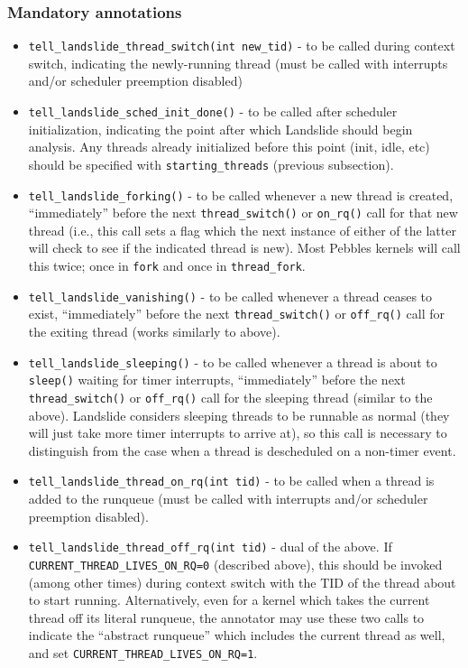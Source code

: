 \subsubsection{Mandatory annotations}

\begin{itemize}
	\item {\tt tell\_landslide\_thread\_switch(int new\_tid)} - to be called during context switch, indicating the newly-running thread
		(must be called with interrupts and/or scheduler preemption disabled)
	\item {\tt tell\_landslide\_sched\_init\_done()} - to be called after scheduler initialization,
		indicating the point after which Landslide should begin analysis.
		Any threads already initialized before this point (init, idle, etc) should be specified with {\tt starting\_threads} (previous subsection).
	\item {\tt tell\_landslide\_forking()} - to be called whenever a new thread is created,
		``immediately'' before the next {\tt thread\_switch()} or {\tt on\_rq()} call for that new thread (i.e., this call sets a flag which the next instance of either of the latter will check to see if the indicated thread is new).
		Most Pebbles kernels will call this twice; once in {\tt fork} and once in {\tt thread\_fork}.
	\item {\tt tell\_landslide\_vanishing()} - to be called whenever a thread ceases to exist,
		``immediately'' before the next {\tt thread\_switch()} or {\tt off\_rq()} call for the exiting thread
		(works similarly to above).
	\item {\tt tell\_landslide\_sleeping()} - to be called whenever a thread is about to {\tt sleep()} waiting for timer interrupts,
		``immediately'' before the next {\tt thread\_switch()} or {\tt off\_rq()} call for the sleeping thread
		(similar to the above).
		Landslide considers sleeping threads to be runnable as normal (they will just take more timer interrupts to arrive at),
		so this call is necessary to distinguish from the case when a thread is descheduled on a non-timer event.
	\item {\tt tell\_landslide\_thread\_on\_rq(int tid)} - to be called when a thread is added to the runqueue
		(must be called with interrupts and/or scheduler preemption disabled).
	\item {\tt tell\_landslide\_thread\_off\_rq(int tid)} - dual of the above.
		If {\tt CURRENT\_THREAD\_\allowbreak{}LIVES\_ON\_RQ=0} (described above), this should be invoked (among other times) during context switch with the TID of the thread about to start running.
		Alternatively, %
		even for a kernel which takes the current thread off its literal runqueue,
		the annotator may use these two calls to indicate the ``abstract runqueue'' which includes the current thread as well,
		and set {\tt CURRENT\_THREAD\_LIVES\_ON\_RQ=1}.
\end{itemize}

